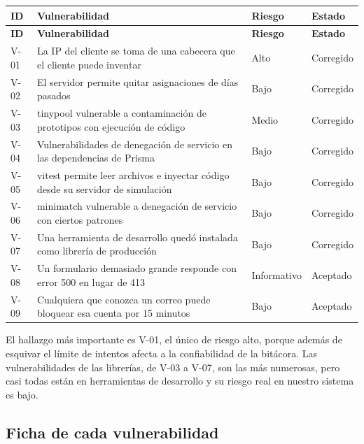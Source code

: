 \documentclass[12pt, letterpaper]{article}
\begin{document}
\begingroup\small\setlength{\tabcolsep}{4pt}\renewcommand{\arraystretch}{1.25}
\begin{longtable}{L{0.08}L{0.60}L{0.13}L{0.12}}
\toprule
\textbf{ID} & \textbf{Vulnerabilidad} & \textbf{Riesgo} & \textbf{Estado} \\
\midrule
\endfirsthead
\toprule
\textbf{ID} & \textbf{Vulnerabilidad} & \textbf{Riesgo} & \textbf{Estado} \\
\midrule
\endhead
\bottomrule
\endfoot
V-01 & La IP del cliente se toma de una cabecera que el cliente puede inventar & Alto & Corregido \\
V-02 & El servidor permite quitar asignaciones de días pasados & Bajo & Corregido \\
V-03 & tinypool vulnerable a contaminación de prototipos con ejecución de código & Medio & Corregido \\
V-04 & Vulnerabilidades de denegación de servicio en las dependencias de Prisma & Bajo & Corregido \\
V-05 & vitest permite leer archivos e inyectar código desde su servidor de simulación & Bajo & Corregido \\
V-06 & minimatch vulnerable a denegación de servicio con ciertos patrones & Bajo & Corregido \\
V-07 & Una herramienta de desarrollo quedó instalada como librería de producción & Bajo & Corregido \\
V-08 & Un formulario demasiado grande responde con error 500 en lugar de 413 & Informativo & Aceptado \\
V-09 & Cualquiera que conozca un correo puede bloquear esa cuenta por 15 minutos & Bajo & Aceptado \\
\end{longtable}
\endgroup

El hallazgo más importante es V-01, el único de riesgo alto, porque además de esquivar el límite de intentos afecta a la confiabilidad de la bitácora. Las vulnerabilidades de las librerías, de V-03 a V-07, son las más numerosas, pero casi todas están en herramientas de desarrollo y su riesgo real en nuestro sistema es bajo.

\subsection{Ficha de cada vulnerabilidad}
\end{document}
